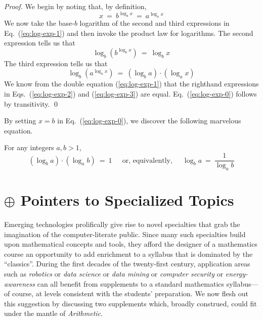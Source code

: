 \begin{proof}
We begin by noting that, by definition,
\begin{equation}
\label{eq:log-exp-1}
 x \ = \ b^{\log_b x} \ = \ a^{\log_a x}
\end{equation}
We now take the base-$b$ logarithm of the second and third expressions in Eq.~(\ref{eq:log-exp-1}) and then invoke the product law for logarithms.  The second expression tells us that
\begin{equation}
\label{eq:log-exp-2}
 \log_b \left(b^{\log_b x} \right) \ = \ \log_b x
\end{equation}
The third expression tells us that
\begin{equation}
\label{eq:log-exp-3}
 \log_b \left( a^{\log_a x} \right) \ = \
\left(\log_b a \right) \cdot \left( \log_a x \right)
\end{equation}
We know from the double equation (\ref{eq:log-exp-1}) that the righthand expressions in Eqs.~(\ref{eq:log-exp-2}) and (\ref{eq:log-exp-3}) are equal.  Eq.~(\ref{eq:log-exp-0}) follows by transitivity.  \qed
\end{proof}

\noindent
By setting $x = b$ in Eq.~(\ref{eq:log-exp-0}), we discover the following marvelous equation.

\begin{prop}
For any integers $a, b >1$,
\begin{equation}
\left(\log_b a \right) \cdot \left( \log_a b \right) \ = \ 1 \ \ \ \ \
\mbox{ or, equivalently, } \ \ \ \ \
\log_b a \ = \ \frac{1}{\log_a b} 
\end{equation}
\end{prop}


\section{$\oplus$ Pointers to Specialized Topics}

Emerging technologies prolifically give rise to novel specialties that grab the imagination of the computer-literate public.  Since many such specialties build upon mathematical concepts and tools, they afford the designer of a mathematics course an opportunity to add enrichment to a syllabus that is dominated by the ``classics''.  During the first decades of the twenty-first century, application areas such as {\it robotics} or {\it data science} or {\it data mining} or {\it computer security} or {\it energy-awareness} can all benefit from supplements to a standard mathematics syllabus---of course, at levels consistent with the students' preparation.  We now flesh out this suggestion by discussing two supplements which, broadly construed, could fit under the mantle of {\it Arithmetic}.

